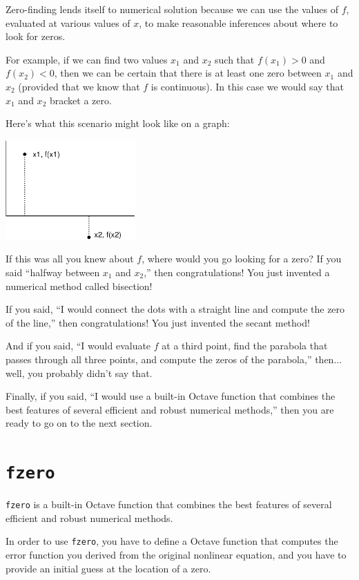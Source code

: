 \documentclass{book}
\begin{document}
Zero-finding lends itself to numerical solution because we can
use the values of $f$, evaluated at various values of $x$, to
make reasonable inferences about where to look for zeros.

For example, if we can find two values $x_1$ and $x_2$ such that
$f(x_1) > 0$ and $f(x_2) < 0$, then we can be certain that there is at
least one zero between $x_1$ and $x_2$ (provided that we know that $f$
is continuous). In this case we would say that $x_1$ and $x_2$
bracket a zero.

Here's what this scenario might look like on a graph:

\beforefig \centerline{\includegraphics[height=1.5in]{figs/secant.eps}}

If this was all you knew about $f$, where would you go looking for
a zero? If you said ``halfway between $x_1$ and $x_2$,'' then
congratulations! You just invented a numerical method called
bisection!

If you said, ``I would connect the dots with a straight line
and compute the zero of the line,'' then
congratulations! You just invented the secant method!

And if you said, ``I would evaluate $f$ at a third point, find the
parabola that passes through all three points, and compute the zeros
of the parabola,'' then... well, you probably didn't say that.

Finally, if you said, ``I would use a built-in Octave function that
combines the best features of several efficient and robust
numerical methods,'' then you are ready to go on to the next section.


\section{{\tt fzero}}
\label{fzero}

{\tt fzero} is a built-in Octave function that
combines the best features of several efficient and robust
numerical methods.

In order to use {\tt fzero}, you have to define a Octave function
that computes the error function you derived from the original
nonlinear equation, and you have to provide an initial guess at
the location of a zero.
\end{document}

